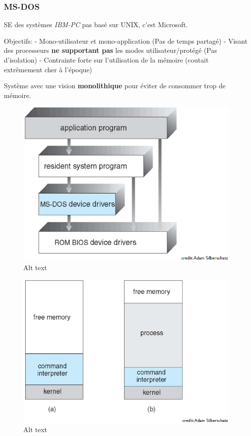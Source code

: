 \subsubsection{MS-DOS}\label{ms-dos}

SE des systèmes \emph{IBM-PC} pas basé sur UNIX, c'est Microsoft.

Objectifs: - Mono-utilisateur et mono-application (Pas de temps partagé)
- Visant des processeurs \textbf{ne supportant pas} les modes
utilisateur/protégé (Pas d'isolation) - Contrainte forte sur
l'utilisation de la mémoire (coutait extrêmement cher à l'époque)

Système avec une vision \textbf{monolithique} pour éviter de consommer
trop de mémoire.

\begin{figure}
\centering
\includegraphics{image-16.png}
\caption{Alt text}
\end{figure}

\begin{figure}
\centering
\includegraphics{image-17.png}
\caption{Alt text}
\end{figure}

